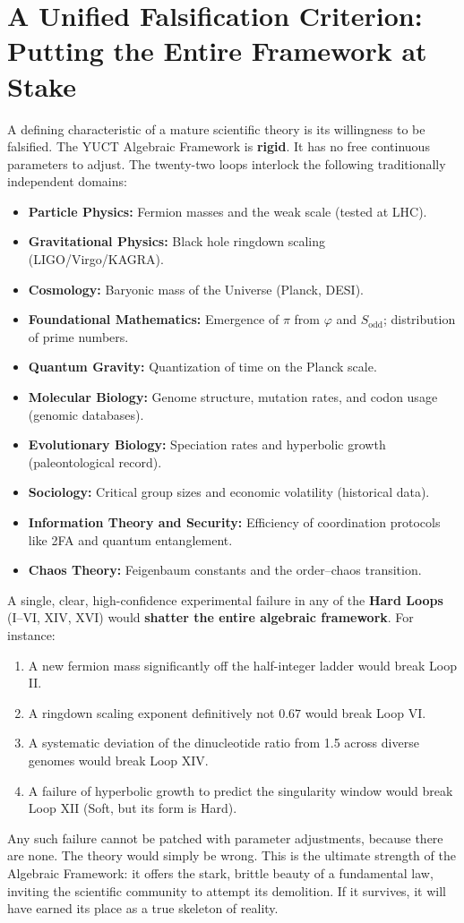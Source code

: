 \documentclass[12pt,a4paper]{article}
\begin{document}
	\section*{A Unified Falsification Criterion: Putting the Entire Framework at Stake}
	
	A defining characteristic of a mature scientific theory is its willingness to be falsified. The YUCT Algebraic Framework is \textbf{rigid}. It has no free continuous parameters to adjust. The twenty-two loops interlock the following traditionally independent domains:
	\begin{itemize}
		\item \textbf{Particle Physics:} Fermion masses and the weak scale (tested at LHC).
		\item \textbf{Gravitational Physics:} Black hole ringdown scaling (LIGO/Virgo/KAGRA).
		\item \textbf{Cosmology:} Baryonic mass of the Universe (Planck, DESI).
		\item \textbf{Foundational Mathematics:} Emergence of \(\pi\) from \(\varphi\) and \(S_{\mathrm{odd}}\); distribution of prime numbers.
		\item \textbf{Quantum Gravity:} Quantization of time on the Planck scale.
		\item \textbf{Molecular Biology:} Genome structure, mutation rates, and codon usage (genomic databases).
		\item \textbf{Evolutionary Biology:} Speciation rates and hyperbolic growth (paleontological record).
		\item \textbf{Sociology:} Critical group sizes and economic volatility (historical data).
		\item \textbf{Information Theory and Security:} Efficiency of coordination protocols like 2FA and quantum entanglement.
		\item \textbf{Chaos Theory:} Feigenbaum constants and the order–chaos transition.
	\end{itemize}
	A single, clear, high-confidence experimental failure in any of the \textbf{Hard Loops} (I–VI, XIV, XVI) would \textbf{shatter the entire algebraic framework}. For instance:
	\begin{enumerate}
		\item A new fermion mass significantly off the half-integer ladder would break Loop II.
		\item A ringdown scaling exponent definitively not \(0.67\) would break Loop VI.
		\item A systematic deviation of the dinucleotide ratio from 1.5 across diverse genomes would break Loop XIV.
		\item A failure of hyperbolic growth to predict the singularity window would break Loop XII (Soft, but its form is Hard).
	\end{enumerate}
	Any such failure cannot be patched with parameter adjustments, because there are none. The theory would simply be wrong. This is the ultimate strength of the Algebraic Framework: it offers the stark, brittle beauty of a fundamental law, inviting the scientific community to attempt its demolition. If it survives, it will have earned its place as a true skeleton of reality.
	
\end{document}
